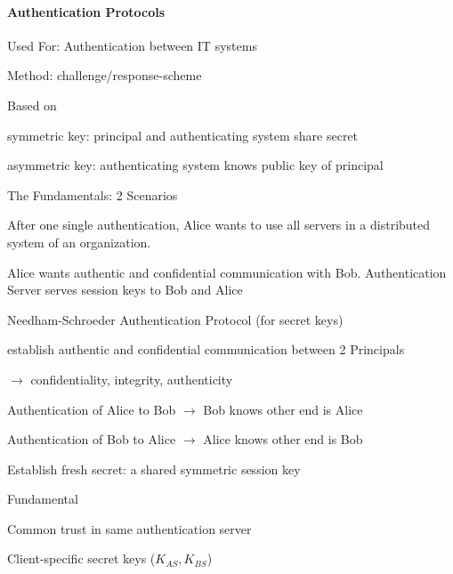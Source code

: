 \documentclass[a4paper]{article}
\begin{document}
\begin{multicols}{3}
    \paragraph{Authentication Protocols}
    \begin{itemize*}
        \item Used For: Authentication between IT systems
        \item Method: challenge/response-scheme
        \item Based on
        \begin{itemize*}
            \item symmetric key: principal and authenticating system share secret
            \item asymmetric key: authenticating system knows public key of principal
        \end{itemize*}
    \end{itemize*}
    The Fundamentals: 2 Scenarios
    \begin{enumerate*}
        \item After one single authentication, Alice wants to use all servers in a distributed system of an organization.
        \item Alice wants authentic and confidential communication with Bob. Authentication Server serves session keys to Bob and Alice
    \end{enumerate*}

    Needham-Schroeder Authentication Protocol (for secret keys)
    \begin{itemize*}
        \item establish authentic and confidential communication between 2 Principals
        \item[$\rightarrow$] confidentiality, integrity, authenticity
    \end{itemize*}
    \begin{enumerate*}
        \item Authentication of Alice to Bob $\rightarrow$ Bob knows other end is Alice
        \item Authentication of Bob to Alice $\rightarrow$ Alice knows other end is Bob
        \item Establish fresh secret: a shared symmetric session key
    \end{enumerate*}

    Fundamental
    \begin{itemize*}
        \item Common trust in same authentication server
        \item Client-specific secret keys ($K_{AS}, K_{BS}$)
    \end{itemize*}


\end{multicols}
\end{document}

